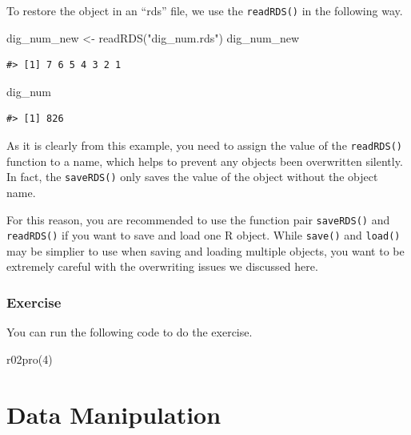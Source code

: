 \documentclass[
]{book}
\newenvironment{Shaded}{\begin{snugshade}}{\end{snugshade}}
\newcommand{\DecValTok}[1]{\textcolor[rgb]{0.00,0.00,0.81}{#1}}
\newcommand{\FunctionTok}[1]{\textcolor[rgb]{0.00,0.00,0.00}{#1}}
\newcommand{\NormalTok}[1]{#1}
\newcommand{\OtherTok}[1]{\textcolor[rgb]{0.56,0.35,0.01}{#1}}
\newcommand{\StringTok}[1]{\textcolor[rgb]{0.31,0.60,0.02}{#1}}
\begin{document}
To restore the object in an ``rds'' file, we use the \texttt{readRDS()} in the following way.

\begin{Shaded}
\begin{Highlighting}[]
\NormalTok{dig\_num\_new }\OtherTok{\textless{}{-}} \FunctionTok{readRDS}\NormalTok{(}\StringTok{"dig\_num.rds"}\NormalTok{)}
\NormalTok{dig\_num\_new}
\end{Highlighting}
\end{Shaded}

\begin{verbatim}
#> [1] 7 6 5 4 3 2 1
\end{verbatim}

\begin{Shaded}
\begin{Highlighting}[]
\NormalTok{dig\_num}
\end{Highlighting}
\end{Shaded}

\begin{verbatim}
#> [1] 826
\end{verbatim}

As it is clearly from this example, you need to assign the value of the \texttt{readRDS()} function to a name, which helps to prevent any objects been overwritten silently. In fact, the \texttt{saveRDS()} only saves the value of the object without the object name.

For this reason, you are recommended to use the function pair \texttt{saveRDS()} and \texttt{readRDS()} if you want to save and load one R object. While \texttt{save()} and \texttt{load()} may be simplier to use when saving and loading multiple objects, you want to be extremely careful with the overwriting issues we discussed here.

\hypertarget{exercise-12}{%
\subsection{Exercise}\label{exercise-12}}

You can run the following code to do the exercise.

\begin{Shaded}
\begin{Highlighting}[]
\FunctionTok{r02pro}\NormalTok{(}\DecValTok{4}\NormalTok{)}
\end{Highlighting}
\end{Shaded}

\hypertarget{data-manipulation}{%
\chapter{Data Manipulation}\label{data-manipulation}}
\end{document}
